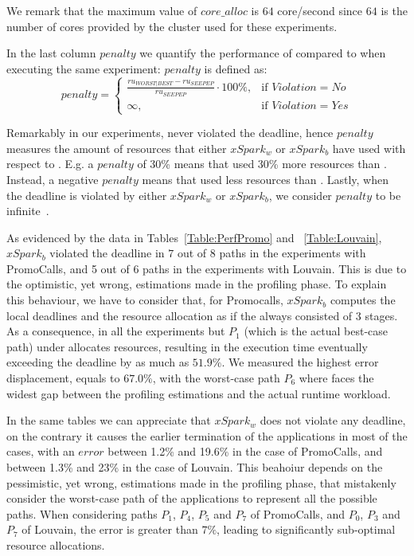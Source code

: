 We remark that the maximum value of $core\_alloc$ is $64$ core/second since $64$ is the number of cores provided by the cluster used for these experiments.

In the last column $penalty$ we quantify the performance of \tool compared to  \cSpark when executing the same experiment: $penalty$ is defined as:
\[
penalty = 
\begin{cases}
\frac{ru_{WORST|BEST}-ru_{SEEPEP}}{ru_{SEEPEP}}\cdot 100\%,& \text{if } Violation = No \\
\infty,              & \text{if } Violation = Yes
\end{cases}
\]

Remarkably in our experiments, \tool never violated the deadline, hence $penalty$ measures the amount of resources that either $xSpark_w$ or $xSpark_b$ have used with respect to \tool. E.g. a $penalty$ of 30\% means that \cSpark used 30\% more resources than \tool. Instead, a negative $penalty$ means that \cSpark used less  resources than \tool. Lastly, when the deadline is violated by either $xSpark_w$ or $xSpark_b$, we consider $penalty$ to be infinite~\cite{shin1994real}. 

As evidenced by the data in Tables~\ref{Table:PerfPromo} and ~\ref{Table:Louvain},  $xSpark_b$ violated the deadline in $7$ out of $8$ paths in the experiments with PromoCalls, and 5 out of 6 paths in the experiments with Louvain. This is due to the optimistic, yet wrong, estimations made in the profiling phase. To explain this behaviour, we have to consider that, for Promocalls, $xSpark_b$ computes the local deadlines and the resource allocation  as if the \plan always consisted of $3$ stages. As a consequence, in all the experiments but $P_1$ (which is the actual best-case path) \cSpark under allocates resources, resulting in the execution time eventually exceeding the deadline by as much as $51.9\%$. We measured the highest error displacement, equals to $67.0\%$, with the worst-case path $P_6$ where \cSpark faces the widest gap between the profiling estimations and the actual runtime workload. 

In the same tables we can appreciate that $xSpark_w$ does not violate any deadline, on the contrary it causes the earlier termination of the applications in most of the cases, with an $error$ between 1.2\% and 19.6\% in the case of PromoCalls, and between 1.3\% and 23\% in the case of Louvain. This beahoiur depends on the pessimistic, yet wrong, estimations made in the profiling phase,  that mistakenly consider the worst-case path of the applications to represent all the possible paths.
When considering paths $P_1$, $P_4$, $P_5$ and $P_7$ of PromoCalls,  and  $P_0$, $P_3$ and $P_7$ of Louvain, the error is greater than $7\%$, leading  to significantly sub-optimal resource allocations. 

